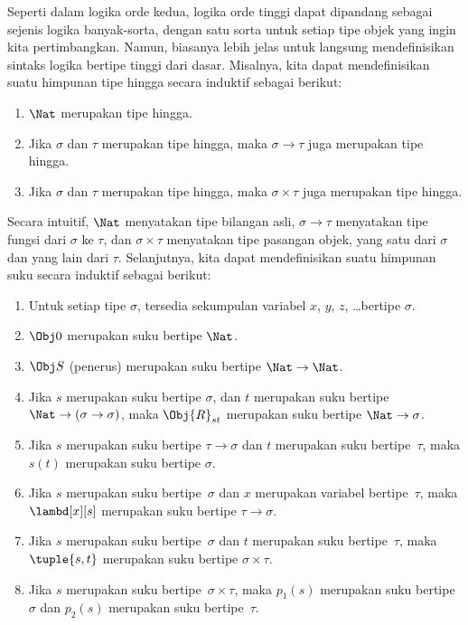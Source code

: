 \documentclass[../../../include/open-logic-section]{subfiles}
\begin{document}
Seperti dalam logika orde kedua, logika orde tinggi dapat dipandang sebagai
sejenis logika banyak-sorta, dengan satu sorta untuk setiap tipe objek yang
ingin kita pertimbangkan. Namun, biasanya lebih jelas untuk langsung
mendefinisikan sintaks logika bertipe tinggi dari dasar. Misalnya, kita dapat
mendefinisikan suatu himpunan tipe hingga secara induktif sebagai berikut:
\begin{enumerate}
\item $\Nat$ merupakan tipe hingga.
\item Jika $\sigma$ dan $\tau$ merupakan tipe hingga, maka $\sigma
  \to \tau$ juga merupakan tipe hingga.
\item Jika $\sigma$ dan $\tau$ merupakan tipe hingga, maka $\sigma \times
  \tau$ juga merupakan tipe hingga.
\end{enumerate}
Secara intuitif, $\Nat$ menyatakan tipe bilangan asli, $\sigma \to \tau$
menyatakan tipe fungsi dari $\sigma$ ke $\tau$, dan $\sigma \times \tau$
menyatakan tipe pasangan objek, yang satu dari $\sigma$ dan yang lain dari
$\tau$. Selanjutnya, kita dapat mendefinisikan suatu himpunan suku secara
induktif sebagai berikut:
\begin{enumerate}
\item Untuk setiap tipe $\sigma$, tersedia sekumpulan variabel $x$, $y$,
  $z$, \dots bertipe $\sigma$.
\item $\Obj 0$ merupakan suku bertipe $\Nat$.
\item $\Obj S$ (penerus) merupakan suku bertipe $\Nat \to \Nat$.
\item Jika $s$ merupakan suku bertipe $\sigma$, dan $t$ merupakan suku
  bertipe $\Nat \to (\sigma \to \sigma)$, maka $\Obj{R}_{st}$ merupakan
  suku bertipe $\Nat \to \sigma$.
\item Jika $s$ merupakan suku bertipe $\tau \to \sigma$ dan $t$ merupakan
  suku bertipe~$\tau$, maka $s(t)$ merupakan suku bertipe $\sigma$.
\item Jika $s$ merupakan suku bertipe~$\sigma$ dan $x$ merupakan variabel
  bertipe~$\tau$, maka $\lambd[x][s]$ merupakan suku bertipe $\tau \to
  \sigma$.
\item Jika $s$ merupakan suku bertipe~$\sigma$ dan $t$ merupakan suku
  bertipe~$\tau$, maka $\tuple{s, t}$ merupakan suku bertipe $\sigma \times
  \tau$.
\item Jika $s$ merupakan suku bertipe~$\sigma \times \tau$, maka $p_1(s)$
  merupakan suku bertipe~$\sigma$ dan $p_2(s)$ merupakan suku
  bertipe~$\tau$.
\end{enumerate}
\end{document}
